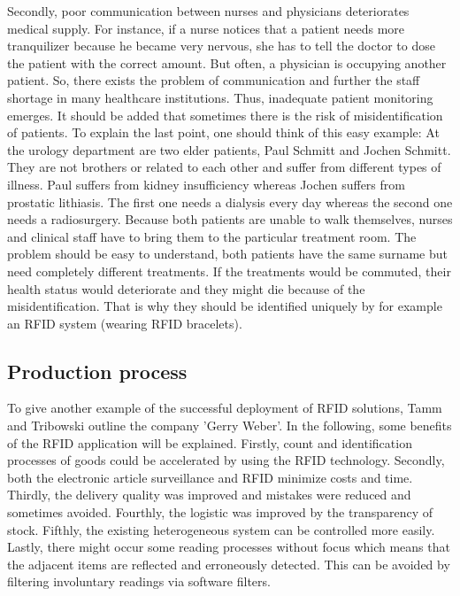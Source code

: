 Secondly, poor communication between nurses and physicians deteriorates medical supply. For instance, if a nurse notices that a patient needs more tranquilizer because he became very nervous, she has to tell the doctor to dose the patient with the correct amount. But often, a physician is occupying another patient. So, there exists the problem of communication and further the staff shortage in many healthcare institutions. Thus, inadequate patient monitoring emerges. It should be added that sometimes there is the risk of misidentification of patients.
To explain the last point, one should think of this easy example: At the urology department are two elder patients, Paul Schmitt and Jochen Schmitt. They are not brothers or related to each other and suffer from different types of illness. Paul suffers from kidney insufficiency whereas Jochen suffers from prostatic lithiasis. The first one needs a dialysis every day whereas the second one needs a radiosurgery. Because both patients are unable to walk themselves, nurses and clinical staff have to bring them to the particular treatment room. The problem should be easy to understand, both patients have the same surname but need completely different treatments. If the treatments would be commuted, their health status would deteriorate and they might die because of the misidentification. That is why they should be identified uniquely by for example an RFID system (wearing RFID bracelets).

\subsection{Production process}

To give another example of the successful deployment of RFID solutions, Tamm and Tribowski \cite[p.110 ff.]{fokus} outline the company 'Gerry Weber'. In the following, some benefits of the RFID application will be explained. Firstly, count and identification processes of goods could be accelerated by using the RFID technology. Secondly, both the electronic article surveillance and RFID minimize costs and time. Thirdly, the delivery quality was improved and mistakes were reduced and sometimes avoided. Fourthly, the logistic was improved by the transparency of stock. Fifthly, the existing heterogeneous system can be controlled more easily. Lastly, there might occur some reading processes without focus which means that the adjacent items are reflected and erroneously detected. This can be avoided by filtering involuntary readings via software filters.  

